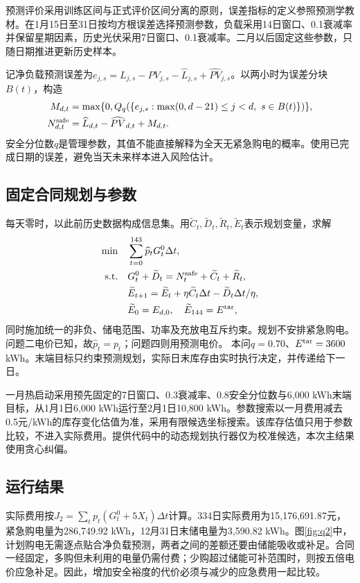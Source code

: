 \documentclass[12pt,a4paper,fontset=windows]{ctexart}
\begin{document}
预测评价采用训练区间与正式评价区间分离的原则，误差指标的定义参照预测学教材\cite{forecast}。在1月15日至31日按均方根误差选择预测参数，负载采用14日窗口、0.1衰减率并保留星期因素，历史光伏采用7日窗口、0.1衰减率。二月以后固定这些参数，只随日期推进更新历史样本。

记净负载预测误差为$e_{j,s}=L_{j,s}-PV_{j,s}-\widehat L_{j,s}+\widehat{PV}_{j,s}$。以两小时为误差分块$B(t)$，构造
\begin{align}
M_{d,t}&=\max\{0,Q_q(\{e_{j,s}:\max(0,d-21)\le j<d,\ s\in B(t)\})\},\\
N^{\rm safe}_{d,t}&=\widehat L_{d,t}-\widehat{PV}_{d,t}+M_{d,t}.
\end{align}
安全分位数$q$是管理参数，其值不能直接解释为全天无紧急购电的概率。使用已完成日期的误差，避免当天未来样本进入风险估计。

\subsection{固定合同规划与参数}
每天零时，以此前历史数据构成信息集。用$\widetilde C_t,\widetilde D_t,\widetilde R_t,\widetilde E_t$表示规划变量，求解
\begin{align}
\min\quad &\sum_{t=0}^{143}\widehat p_tG_t^0\Delta t,\\
\text{s.t.}\quad&G_t^0+\widetilde D_t=N_t^{\rm safe}+\widetilde C_t+\widetilde R_t,\\
&\widetilde E_{t+1}=\widetilde E_t+\eta\widetilde C_t\Delta t-\widetilde D_t\Delta t/\eta,\\
&\widetilde E_0=E_{d,0},\quad \widetilde E_{144}=E^{\rm tar},
\end{align}
同时施加统一的非负、储电范围、功率及充放电互斥约束。规划不安排紧急购电。问题二电价已知，故$\widehat p_t=p_t$；问题四则用预测电价。
本问$q=0.70$、$E^{\rm tar}=3600$ kWh。末端目标只约束预测规划，实际日末库存由实时执行决定，并传递给下一日。

一月热启动采用预先固定的7日窗口、0.3衰减率、0.8安全分位数与6,000 kWh末端目标，从1月1日6,000 kWh运行至2月1日10,800 kWh。参数搜索以一月费用减去0.5元/kWh的库存变化估值为准，采用有限候选坐标搜索。该库存估值只用于参数比较，不进入实际费用。提供代码中的动态规划执行器仅为校准候选，本次主结果使用贪心纠偏。

\subsection{运行结果}
实际费用按$J_2=\sum_t p_t(G_t^0+5X_t)\Delta t$计算。334日实际费用为15,176,691.87元，紧急购电量为286,749.92 kWh，12月31日末储电量为3,590.82 kWh。图\ref{fig:q2}中，计划购电无需逐点贴合净负载预测，两者之间的差额还要由储能吸收或补足。合同一经固定，多购但未利用的电量仍需付费；少购超过储能可补范围时，则按五倍电价应急补足。因此，增加安全裕度的代价必须与减少的应急费用一起比较。
\end{document}
